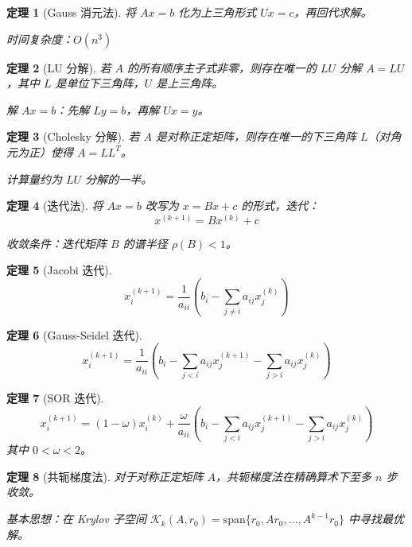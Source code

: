 \documentclass[12pt]{article}
\newtheorem{theorem}{定理}[section]
\begin{document}
\begin{theorem}[Gauss 消元法]
将 $Ax = b$ 化为上三角形式 $Ux = c$，再回代求解。

时间复杂度：$O(n^3)$
\end{theorem}

\begin{theorem}[LU 分解]
若 $A$ 的所有顺序主子式非零，则存在唯一的 $LU$ 分解 $A = LU$，其中 $L$ 是单位下三角阵，$U$ 是上三角阵。

解 $Ax = b$：先解 $Ly = b$，再解 $Ux = y$。
\end{theorem}

\begin{theorem}[Cholesky 分解]
若 $A$ 是对称正定矩阵，则存在唯一的下三角阵 $L$（对角元为正）使得 $A = LL^T$。

计算量约为 $LU$ 分解的一半。
\end{theorem}

\begin{theorem}[迭代法]
将 $Ax = b$ 改写为 $x = Bx + c$ 的形式，迭代：
$$x^{(k+1)} = Bx^{(k)} + c$$

收敛条件：迭代矩阵 $B$ 的谱半径 $\rho(B) < 1$。
\end{theorem}

\begin{theorem}[Jacobi 迭代]
$$x_i^{(k+1)} = \frac{1}{a_{ii}}\left(b_i - \sum_{j \neq i} a_{ij}x_j^{(k)}\right)$$
\end{theorem}

\begin{theorem}[Gauss-Seidel 迭代]
$$x_i^{(k+1)} = \frac{1}{a_{ii}}\left(b_i - \sum_{j < i} a_{ij}x_j^{(k+1)} - \sum_{j > i} a_{ij}x_j^{(k)}\right)$$
\end{theorem}

\begin{theorem}[SOR 迭代]
$$x_i^{(k+1)} = (1-\omega)x_i^{(k)} + \frac{\omega}{a_{ii}}\left(b_i - \sum_{j < i} a_{ij}x_j^{(k+1)} - \sum_{j > i} a_{ij}x_j^{(k)}\right)$$
其中 $0 < \omega < 2$。
\end{theorem}

\begin{theorem}[共轭梯度法]
对于对称正定矩阵 $A$，共轭梯度法在精确算术下至多 $n$ 步收敛。

基本思想：在 Krylov 子空间 $\mathcal{K}_k(A, r_0) = \text{span}\{r_0, Ar_0, \ldots, A^{k-1}r_0\}$ 中寻找最优解。
\end{theorem}

\end{document}
